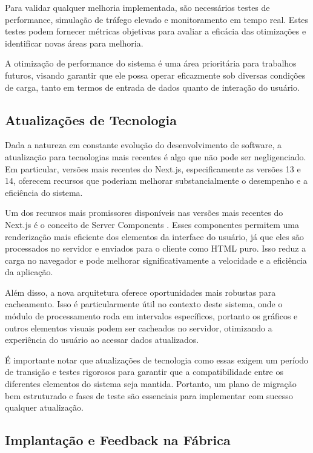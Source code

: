 Para validar qualquer melhoria implementada, são necessários testes de performance, simulação de tráfego elevado e monitoramento em tempo real. Estes testes podem fornecer métricas objetivas para avaliar a eficácia das otimizações e identificar novas áreas para melhoria.

A otimização de performance do sistema é uma área prioritária para trabalhos futuros, visando garantir que ele possa operar eficazmente sob diversas condições de carga, tanto em termos de entrada de dados quanto de interação do usuário.

\subsection{Atualizações de Tecnologia}
Dada a natureza em constante evolução do desenvolvimento de software, a atualização para tecnologias mais recentes é algo que não pode ser negligenciado. Em particular, versões mais recentes do Next.js, especificamente as versões 13 e 14, oferecem recursos que poderiam melhorar substancialmente o desempenho e a eficiência do sistema.

Um dos recursos mais promissores disponíveis nas versões mais recentes do Next.js é o conceito de Server Components \cite{nextjsServerComponents}. Esses componentes permitem uma renderização mais eficiente dos elementos da interface do usuário, já que eles são processados no servidor e enviados para o cliente como HTML puro. Isso reduz a carga no navegador e pode melhorar significativamente a velocidade e a eficiência da aplicação.

Além disso, a nova arquitetura oferece oportunidades mais robustas para cacheamento. Isso é particularmente útil no contexto deste sistema, onde o módulo de processamento roda em intervalos específicos, portanto os gráficos e outros elementos visuais podem ser cacheados no servidor, otimizando a experiência do usuário ao acessar dados atualizados.

É importante notar que atualizações de tecnologia como essas exigem um período de transição e testes rigorosos para garantir que a compatibilidade entre os diferentes elementos do sistema seja mantida. Portanto, um plano de migração bem estruturado e fases de teste são essenciais para implementar com sucesso qualquer atualização.


\subsection{Implantação e Feedback na Fábrica}

